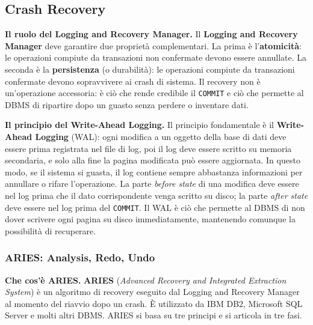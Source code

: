 \documentclass[12pt]{extarticle}
\begin{document}
\subsection{Crash Recovery}

\noindent \textbf{Il ruolo del Logging and Recovery Manager.} Il \textbf{Logging and Recovery Manager} deve garantire due proprietà complementari. La prima è l'\textbf{atomicità}: le operazioni compiute da transazioni non confermate devono essere annullate. La seconda è la \textbf{persistenza} (o durabilità): le operazioni compiute da transazioni confermate devono sopravvivere ai crash di sistema. Il recovery non è un'operazione accessoria: è ciò che rende credibile il \texttt{COMMIT} e ciò che permette al DBMS di ripartire dopo un guasto senza perdere o inventare dati.

\medskip
\noindent \textbf{Il principio del Write-Ahead Logging.} Il principio fondamentale è il \textbf{Write-Ahead Logging} (WAL): ogni modifica a un oggetto della base di dati deve essere prima registrata nel file di log, poi il log deve essere scritto su memoria secondaria, e solo alla fine la pagina modificata può essere aggiornata. In questo modo, se il sistema si guasta, il log contiene sempre abbastanza informazioni per annullare o rifare l'operazione. La parte \textit{before state} di una modifica deve essere nel log prima che il dato corrispondente venga scritto su disco; la parte \textit{after state} deve essere nel log prima del \texttt{COMMIT}. Il WAL è ciò che permette al DBMS di non dover scrivere ogni pagina su disco immediatamente, mantenendo comunque la possibilità di recuperare.

\subsubsection{ARIES: Analysis, Redo, Undo}

\noindent \textbf{Che cos'è ARIES.} \textbf{ARIES} (\textit{Advanced Recovery and Integrated Extraction System}) è un algoritmo di recovery eseguito dal Logging and Recovery Manager al momento del riavvio dopo un crash. È utilizzato da IBM DB2, Microsoft SQL Server e molti altri DBMS. ARIES si basa su tre principi e si articola in tre fasi.
\end{document}
